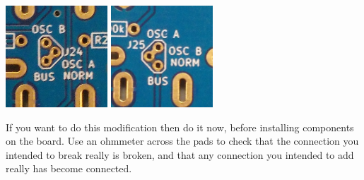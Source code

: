 \noindent\includegraphics[width={1.50in}]{osca-norm.jpg}\quad
\includegraphics[width={1.50in}]{oscb-norm.jpg}

If you want to do this modification then do it now, before installing
components on the board.  Use an ohmmeter across the pads to check that the
connection you intended to break really is broken, and that any connection
you intended to add really has become connected.

